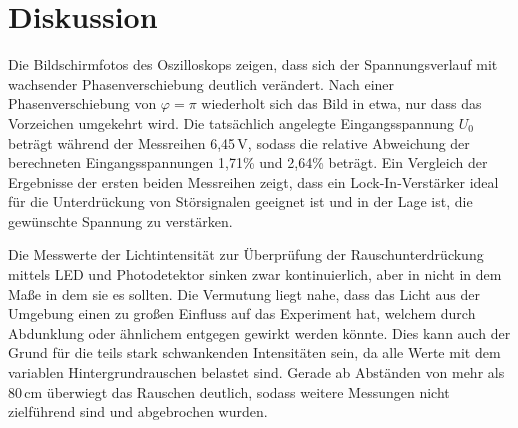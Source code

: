 \section{Diskussion}
\label{sec:Diskussion}
Die Bildschirmfotos des Oszilloskops zeigen, dass sich der Spannungsverlauf mit wachsender
Phasenverschiebung deutlich verändert. Nach einer Phasenverschiebung von  $\varphi = \pi$
wiederholt sich das Bild in etwa, nur dass das Vorzeichen umgekehrt wird.
Die tatsächlich angelegte Eingangsspannung $U_\text{0}$
beträgt während der Messreihen 6,45\,V, sodass die relative Abweichung der berechneten
Eingangsspannungen 1,71\% und 2,64\% beträgt. Ein Vergleich der Ergebnisse der ersten beiden Messreihen zeigt, dass ein 
Lock-In-Verstärker ideal für die Unterdrückung von Störsignalen geeignet ist und in der Lage ist,
die gewünschte Spannung zu verstärken.

Die Messwerte der Lichtintensität zur Überprüfung der Rauschunterdrückung mittels LED und Photodetektor sinken
zwar kontinuierlich, aber in nicht in dem Maße in dem sie es sollten. Die Vermutung liegt nahe,
dass das Licht aus der Umgebung einen zu großen Einfluss auf das Experiment hat, welchem durch
Abdunklung oder ähnlichem entgegen gewirkt werden könnte. Dies kann auch der Grund für die teils
stark schwankenden Intensitäten sein, da alle Werte mit dem variablen Hintergrundrauschen belastet sind.
Gerade ab Abständen von mehr als 80\,cm überwiegt das Rauschen deutlich, sodass weitere Messungen
nicht zielführend sind und abgebrochen wurden.